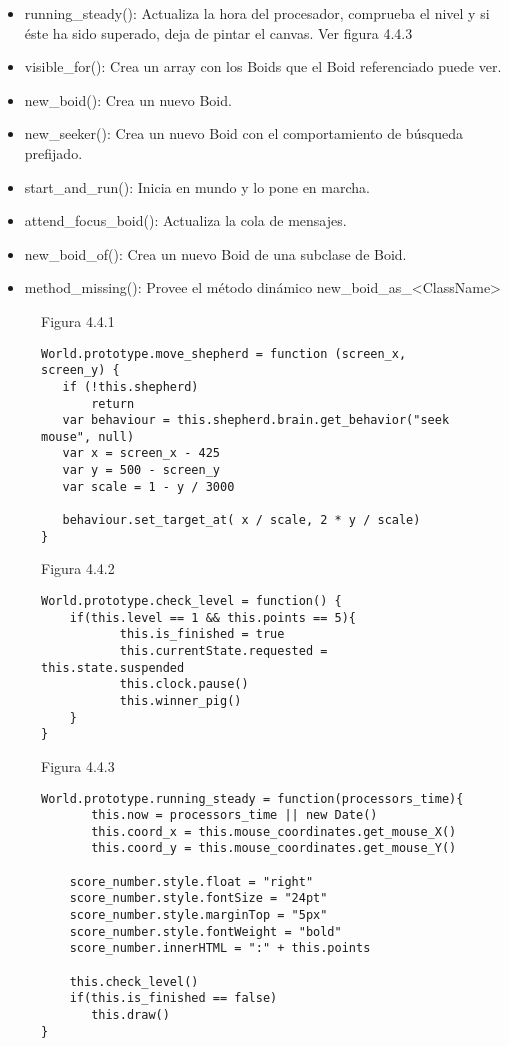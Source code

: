 \begin{itemize}
 \item running\_steady():
Actualiza la hora del procesador, comprueba el nivel y si éste ha sido superado, deja de pintar el canvas. Ver figura 4.4.3

 \item visible\_for():
Crea un array con los Boids que el Boid referenciado puede ver.

 \item new\_boid():
Crea un nuevo Boid.

 \item new\_seeker():
Crea un nuevo Boid con el comportamiento de búsqueda prefijado.

 \item start\_and\_run():
Inicia en mundo y lo pone en marcha.

 \item attend\_focus\_boid():
Actualiza la cola de mensajes.

 \item new\_boid\_of():
Crea un nuevo Boid de una subclase de Boid.

 \item method\_missing():
Provee el método dinámico new\_boid\_as\_<ClassName>
\end{itemize}


\begin{figure}[p]
Figura 4.4.1
\begin{verbatim}
World.prototype.move_shepherd = function (screen_x, screen_y) {
   if (!this.shepherd)
       return
   var behaviour = this.shepherd.brain.get_behavior("seek mouse", null)
   var x = screen_x - 425
   var y = 500 - screen_y
   var scale = 1 - y / 3000

   behaviour.set_target_at( x / scale, 2 * y / scale)
}
\end{verbatim}


Figura 4.4.2
\begin{verbatim}
World.prototype.check_level = function() {
    if(this.level == 1 && this.points == 5){
           this.is_finished = true
           this.currentState.requested = this.state.suspended
           this.clock.pause()
           this.winner_pig()
    }
}
\end{verbatim}

Figura 4.4.3
\begin{verbatim}
World.prototype.running_steady = function(processors_time){
       this.now = processors_time || new Date()
       this.coord_x = this.mouse_coordinates.get_mouse_X()
       this.coord_y = this.mouse_coordinates.get_mouse_Y()

    score_number.style.float = "right"
    score_number.style.fontSize = "24pt"
    score_number.style.marginTop = "5px"
    score_number.style.fontWeight = "bold"
    score_number.innerHTML = ":" + this.points

    this.check_level()
    if(this.is_finished == false)
       this.draw()
}
\end{verbatim}
\end{figure}




